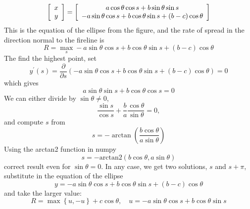 \documentclass{article}%
\begin{document}
\[
\left[
\begin{array}
[c]{c}%
x\\
y
\end{array}
\right]  =\left[
\begin{array}
[c]{c}%
a\cos\theta\cos s+b\sin\theta\sin s\\
-a\sin\theta\cos s+b\cos\theta\sin s+(b-c)\cos\theta
\end{array}
\right]
\]
This is the equation of the ellipse from the figure, and the rate of spread in
the direction normal to the fireline is%
\[
R=\max_{s}-a\sin\theta\cos s+b\cos\theta\sin s+(b-c)\cos\theta
\]
The find the highest point, set%
\[
y^{\prime}\left(  s\right)  =\frac{\partial}{\partial s}\left(  -a\sin
\theta\cos s+b\cos\theta\sin s+(b-c)\cos\theta\right)  =0
\]
which gives%
\[
a\sin\theta\sin s+b\cos\theta\cos s=0
\]
We can either divide by $\sin\theta\neq0$,
\[
\frac{\sin s}{\cos s}+\frac{b}{a}\frac{\cos\theta}{\sin\theta}=0,
\]
and compute $s$ from%
\[
s=-\arctan\left(  \frac{b\cos\theta}{a\sin\theta}\right)
\]
Using the arctan2 function in numpy%
\[
s=-\text{arctan2}\left(  b\cos\theta,a\sin\theta\right)
\]
correct result even for $\sin\theta=0.$ In any case, we get two solutions, $s$
and $s+\pi$,  substitute in the equation of the ellipse%
\[
y=-a\sin\theta\cos s+b\cos\theta\sin s+\left(  b-c\right)  \cos\theta
\]
and take the larger value:%
\[
R=\max\left\{  u,-u\right\}  +c\cos\theta,\quad u=-a\sin\theta\cos
s+b\cos\theta\sin s
\]
\end{document}
